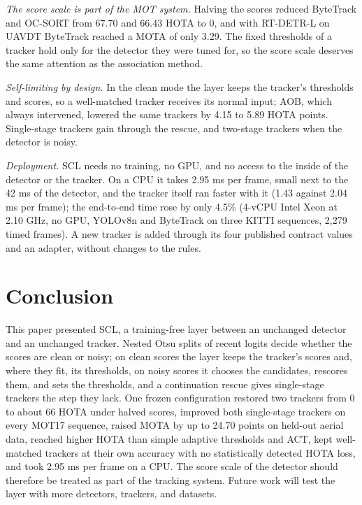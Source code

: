 \documentclass[pdflatex,sn-mathphys-num,iicol]{sn-jnl}
\newcommand{\scl}{SCL}
\newcommand{\aob}{AOB}
\begin{document}
\emph{The score scale is part of the MOT system.} Halving the scores reduced ByteTrack and OC-SORT
from 67.70 and 66.43 HOTA to 0, and with RT-DETR-L on UAVDT ByteTrack reached a MOTA of only 3.29.
The fixed thresholds of a tracker hold only for the detector they were tuned for, so the score
scale deserves the same attention as the association method.

\emph{Self-limiting by design.} In the clean mode the layer keeps the tracker's thresholds and
scores, so a well-matched tracker receives its normal input; \aob{}, which always intervened,
lowered the same trackers by 4.15 to 5.89 HOTA points. Single-stage trackers gain through the
rescue, and two-stage trackers when the detector is noisy.

\emph{Deployment.} \scl{} needs no training, no GPU, and no access to the inside of the detector or
the tracker. On a CPU it takes 2.95 ms per frame, small next to the 42 ms of the detector, and the
tracker itself ran faster with it (1.43 against 2.04 ms per frame); the end-to-end time rose by
only 4.5\% (4-vCPU Intel Xeon at 2.10 GHz, no GPU, YOLOv8n and ByteTrack on three KITTI sequences,
2,279 timed frames). A new tracker is added through its four published contract
values and an adapter, without changes to the rules.
\section{Conclusion}\label{sec:conclusion}

This paper presented \scl{}, a training-free layer between an unchanged detector and an unchanged
tracker. Nested Otsu splits of recent logits decide whether the scores are clean or noisy; on clean
scores the layer keeps the tracker's scores and, where they fit, its thresholds, on noisy scores it chooses the candidates, rescores
them, and sets the thresholds, and a continuation rescue gives single-stage trackers the step they
lack. One frozen configuration restored two trackers from 0 to about 66 HOTA under halved scores,
improved both single-stage trackers on every MOT17 sequence, raised MOTA by up to 24.70 points on
held-out aerial data, reached higher HOTA than simple adaptive thresholds and ACT, kept well-matched
trackers at their own accuracy with no statistically detected HOTA loss, and took 2.95 ms per frame on a CPU. The score scale of the detector should therefore be treated as part of
the tracking system. Future work will test the layer with more detectors, trackers, and datasets.
\end{document}
